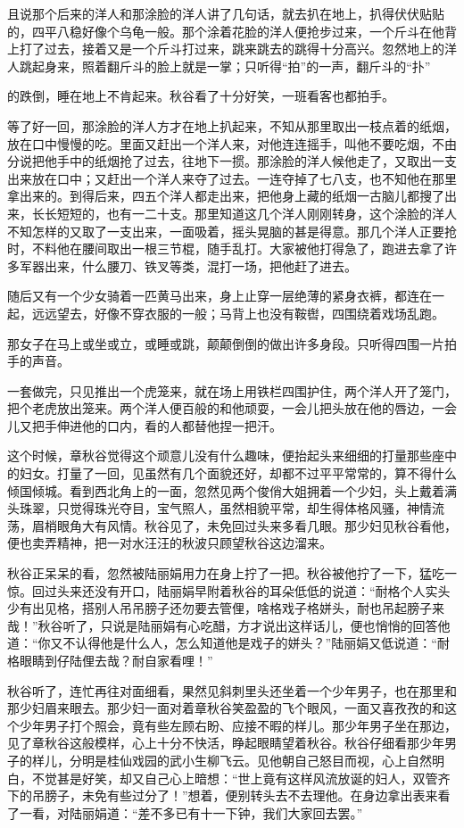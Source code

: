 \documentclass[12pt,UTF8]{ctexbook}
\begin{document}
{{{且说那个后来的洋人和那涂脸的洋人讲了几句话，就去扒在地上，扒得伏伏贴贴的，四平八稳好像个乌龟一般。那个涂着花脸的洋人便抢步过来，一个斤斗在他背上打了过去，接着又是一个斤斗打过来，跳来跳去的跳得十分高兴。忽然地上的洋人跳起身来，照着翻斤斗的脸上就是一掌；只听得“拍”的一声，翻斤斗的“扑”

的跌倒，睡在地上不肯起来。秋谷看了十分好笑，一班看客也都拍手。

等了好一回，那涂脸的洋人方才在地上扒起来，不知从那里取出一枝点着的纸烟，放在口中慢慢的吃。里面又赶出一个洋人来，对他连连摇手，叫他不要吃烟，不由分说把他手中的纸烟抢了过去，往地下一掼。那涂脸的洋人候他走了，又取出一支出来放在口中；又赶出一个洋人来夺了过去。一连夺掉了七八支，也不知他在那里拿出来的。到得后来，四五个洋人都走出来，把他身上藏的纸烟一古脑儿都搜了出来，长长短短的，也有一二十支。那里知道这几个洋人刚刚转身，这个涂脸的洋人不知怎样的又取了一支出来，一面吸着，摇头晃脑的甚是得意。那几个洋人正要抢时，不料他在腰间取出一根三节棍，随手乱打。大家被他打得急了，跑进去拿了许多军器出来，什么腰刀、铁叉等类，混打一场，把他赶了进去。

随后又有一个少女骑着一匹黄马出来，身上止穿一层绝薄的紧身衣裤，都连在一起，远远望去，好像不穿衣服的一般；马背上也没有鞍辔，四围绕着戏场乱跑。

那女子在马上或坐或立，或睡或跳，颠颠倒倒的做出许多身段。只听得四围一片拍手的声音。

一套做完，只见推出一个虎笼来，就在场上用铁栏四围护住，两个洋人开了笼门，把个老虎放出笼来。两个洋人便百般的和他顽耍，一会儿把头放在他的唇边，一会儿又把手伸进他的口内，看的人都替他捏一把汗。

这个时候，章秋谷觉得这个顽意儿没有什么趣味，便抬起头来细细的打量那些座中的妇女。打量了一回，见虽然有几个面貌还好，却都不过平平常常的，算不得什么倾国倾城。看到西北角上的一面，忽然见两个俊俏大姐拥着一个少妇，头上戴着满头珠翠，只觉得珠光夺目，宝气照人，虽然相貌平常，却生得体格风骚，神情流荡，眉梢眼角大有风情。秋谷见了，未免回过头来多看几眼。那少妇见秋谷看他，便也卖弄精神，把一对水汪汪的秋波只顾望秋谷这边溜来。

秋谷正呆呆的看，忽然被陆丽娟用力在身上拧了一把。秋谷被他拧了一下，猛吃一惊。回过头来还没有开口，陆丽娟早附着秋谷的耳朵低低的说道：“耐格个人实头少有出见格，搭别人吊吊膀子还勿要去管俚，啥格戏子格姘头，耐也吊起膀子来哉！”秋谷听了，只说是陆丽娟有心吃醋，方才说出这样话儿，便也悄悄的回答他道：“你又不认得他是什么人，怎么知道他是戏子的姘头？”陆丽娟又低说道：“耐格眼睛到仔陆俚去哉？耐自家看哩！”

秋谷听了，连忙再往对面细看，果然见斜刺里头还坐着一个少年男子，也在那里和那少妇眉来眼去。那少妇一面对着章秋谷笑盈盈的飞个眼风，一面又喜孜孜的和这个少年男子打个照会，竟有些左顾右盼、应接不暇的样儿。那少年男子坐在那边，见了章秋谷这般模样，心上十分不快活，睁起眼睛望着秋谷。秋谷仔细看那少年男子的样儿，分明是桂仙戏园的武小生柳飞云。见他朝自己怒目而视，心上自然明白，不觉甚是好笑，却又自己心上暗想：“世上竟有这样风流放诞的妇人，双管齐下的吊膀子，未免有些过分了！”想着，便别转头去不去理他。在身边拿出表来看了一看，对陆丽娟道：“差不多已有十一下钟，我们大家回去罢。”

}}}
\end{document}
